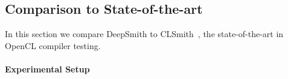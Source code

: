 %
%
%
%
%
%
%


\subsection{Comparison to State-of-the-art}%
\label{subsec:vs_clsmith}

In this section we compare DeepSmith to CLSmith~\cite{Lidbury2015a}, the state-of-the-art in OpenCL compiler testing.

\paragraph{Experimental Setup}

